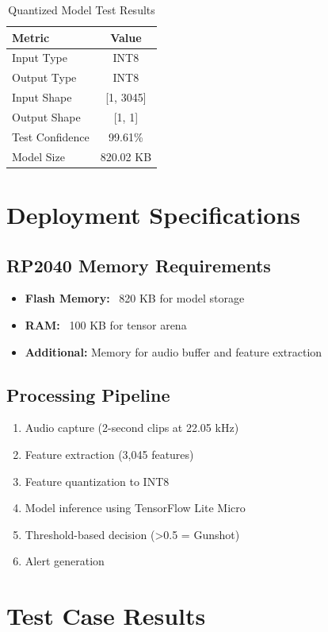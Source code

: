 \documentclass[12pt]{article}
\begin{document}
\begin{table}[H]
\centering
\caption{Quantized Model Test Results}
\begin{tabular}{@{}lc@{}}
\toprule
\textbf{Metric} & \textbf{Value} \\
\midrule
Input Type & INT8 \\
Output Type & INT8 \\
Input Shape & [1, 3045] \\
Output Shape & [1, 1] \\
Test Confidence & 99.61\% \\
Model Size & 820.02 KB \\
\bottomrule
\end{tabular}
\end{table}

\section{Deployment Specifications}

\subsection{RP2040 Memory Requirements}
\begin{itemize}
    \item \textbf{Flash Memory:} ~820 KB for model storage
    \item \textbf{RAM:} ~100 KB for tensor arena
    \item \textbf{Additional:} Memory for audio buffer and feature extraction
\end{itemize}

\subsection{Processing Pipeline}
\begin{enumerate}
    \item Audio capture (2-second clips at 22.05 kHz)
    \item Feature extraction (3,045 features)
    \item Feature quantization to INT8
    \item Model inference using TensorFlow Lite Micro
    \item Threshold-based decision (>0.5 = Gunshot)
    \item Alert generation
\end{enumerate}

\section{Test Case Results}
\end{document}
